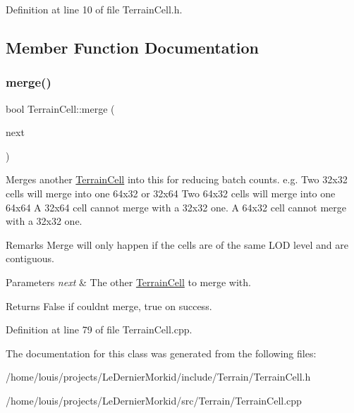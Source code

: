 Definition at line 10 of file Terrain\+Cell.\+h.



\subsection{Member Function Documentation}
\mbox{\label{class_terrain_cell_a18155abf464d4f6d1f3bf59a21eee301}} 
\subsubsection{\texorpdfstring{merge()}{merge()}}
{\footnotesize\ttfamily bool Terrain\+Cell\+::merge (\begin{DoxyParamCaption}\item[{\hyperlink{class_terrain_cell}{Terrain\+Cell} $\ast$}]{next }\end{DoxyParamCaption})}

Merges another \hyperlink{class_terrain_cell}{Terrain\+Cell} into \textquotesingle{}this\textquotesingle{} for reducing batch counts. e.\+g. Two 32x32 cells will merge into one 64x32 or 32x64 Two 64x32 cells will merge into one 64x64 A 32x64 cell cannot merge with a 32x32 one. A 64x32 cell cannot merge with a 32x32 one. \begin{DoxyRemark}{Remarks}
Merge will only happen if the cells are of the same L\+OD level and are contiguous. 
\end{DoxyRemark}

\begin{DoxyParams}{Parameters}
{\em next} & The other \hyperlink{class_terrain_cell}{Terrain\+Cell} to merge with. \\
\hline
\end{DoxyParams}
\begin{DoxyReturn}{Returns}
False if couldn\textquotesingle{}t merge, true on success. 
\end{DoxyReturn}


Definition at line 79 of file Terrain\+Cell.\+cpp.



The documentation for this class was generated from the following files\+:\begin{DoxyCompactItemize}
\item 
/home/louis/projects/\+Le\+Dernier\+Morkid/include/\+Terrain/Terrain\+Cell.\+h\item 
/home/louis/projects/\+Le\+Dernier\+Morkid/src/\+Terrain/Terrain\+Cell.\+cpp\end{DoxyCompactItemize}
